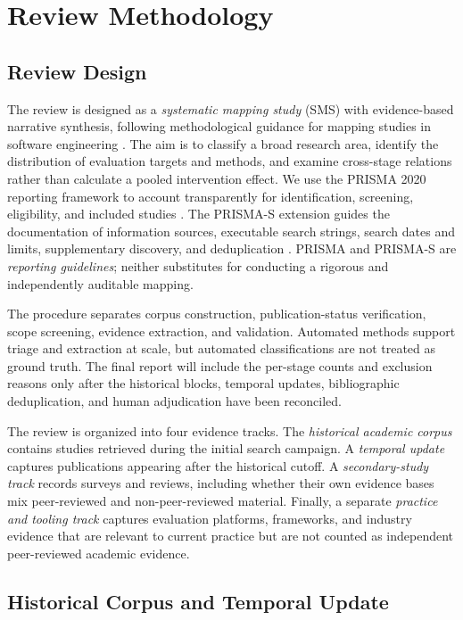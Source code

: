 \section{Review Methodology}
\label{sec:methodology}

\subsection{Review Design}

The review is designed as a \emph{systematic mapping study} (SMS) with evidence-based narrative synthesis, following methodological guidance for mapping studies in software engineering \cite{petersen2015mapping}. The aim is to classify a broad research area, identify the distribution of evaluation targets and methods, and examine cross-stage relations rather than calculate a pooled intervention effect. We use the PRISMA 2020 reporting framework to account transparently for identification, screening, eligibility, and included studies \cite{page2021prisma}. The PRISMA-S extension guides the documentation of information sources, executable search strings, search dates and limits, supplementary discovery, and deduplication \cite{rethlefsen2021prismas}. PRISMA and PRISMA-S are \emph{reporting guidelines}; neither substitutes for conducting a rigorous and independently auditable mapping.

The procedure separates corpus construction, publication-status verification, scope screening, evidence extraction, and validation. Automated methods support triage and extraction at scale, but automated classifications are not treated as ground truth. The final report will include the per-stage counts and exclusion reasons only after the historical blocks, temporal updates, bibliographic deduplication, and human adjudication have been reconciled.

The review is organized into four evidence tracks. The \emph{historical academic corpus} contains studies retrieved during the initial search campaign. A \emph{temporal update} captures publications appearing after the historical cutoff. A \emph{secondary-study track} records surveys and reviews, including whether their own evidence bases mix peer-reviewed and non-peer-reviewed material. Finally, a separate \emph{practice and tooling track} captures evaluation platforms, frameworks, and industry evidence that are relevant to current practice but are not counted as independent peer-reviewed academic evidence.

\subsection{Historical Corpus and Temporal Update}


